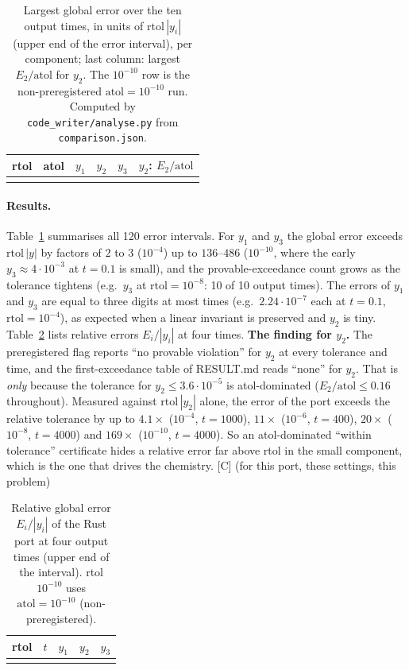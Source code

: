 \documentclass[11pt]{article}
\newcommand{\tier}[1]{\textsf{[#1]}}
\newcommand{\tC}{\tier{C}}
\theoremstyle{remark}
\begin{document}
\begin{table}[ht]\centering\small
\caption{Largest global error over the ten output times, in units of $\mathrm{rtol}\,|y_i|$ (upper end of the error interval), per component; last column: largest $E_2/\mathrm{atol}$ for $y_2$. The $10^{-10}$ row is the non-preregistered $\mathrm{atol}=10^{-10}$ run. Computed by \texttt{code\_writer/analyse.py} from \texttt{comparison.json}.}\label{tab:maxerr}
\begin{tabular}{ccrrrr}\toprule
rtol & atol & $y_1$ & $y_2$ & $y_3$ & $y_2$: $E_2/\mathrm{atol}$\\\midrule
\\
\bottomrule
\end{tabular}
\end{table}

\paragraph{Results.} Table~\ref{tab:maxerr} summarises all 120 error intervals. For $y_1$ and $y_3$ the global error exceeds $\mathrm{rtol}\,|y|$ by factors of $2$ to $3$ ($10^{-4}$) up to $136$--$486$ ($10^{-10}$, where the early $y_3\approx4\cdot10^{-3}$ at $t=0.1$ is small), and the provable-exceedance count grows as the tolerance tightens (e.g.\ $y_3$ at $\mathrm{rtol}=10^{-8}$: 10 of 10 output times). The errors of $y_1$ and $y_3$ are equal to three digits at most times (e.g.\ $2.24\cdot10^{-7}$ each at $t=0.1$, $\mathrm{rtol}=10^{-4}$), as expected when a linear invariant is preserved and $y_2$ is tiny. Table~\ref{tab:sel} lists relative errors $E_i/|y_i|$ at four times.
\textbf{The finding for $y_2$.} The preregistered flag reports ``no provable violation'' for $y_2$ at every tolerance and time, and the first-exceedance table of RESULT.md reads ``none'' for $y_2$. That is \emph{only} because the tolerance for $y_2\le3.6\cdot10^{-5}$ is atol-dominated ($E_2/\mathrm{atol}\le0.16$ throughout). Measured against $\mathrm{rtol}\,|y_2|$ alone, the error of the port exceeds the relative tolerance by up to $4.1\times$ ($10^{-4}$, $t=1000$), $11\times$ ($10^{-6}$, $t=400$), $20\times$ ($10^{-8}$, $t=4000$) and $169\times$ ($10^{-10}$, $t=4000$). So an atol-dominated ``within tolerance'' certificate hides a relative error far above rtol in the small component, which is the one that drives the chemistry. \tC{} (for this port, these settings, this problem)

\begin{table}[ht]\centering\small
\caption{Relative global error $E_i/|y_i|$ of the Rust port at four output times (upper end of the interval). rtol $10^{-10}$ uses $\mathrm{atol}=10^{-10}$ (non-preregistered).}\label{tab:sel}
\begin{tabular}{crccc}\toprule
rtol & $t$ & $y_1$ & $y_2$ & $y_3$\\\midrule
\\
\bottomrule
\end{tabular}
\end{table}
\end{document}
